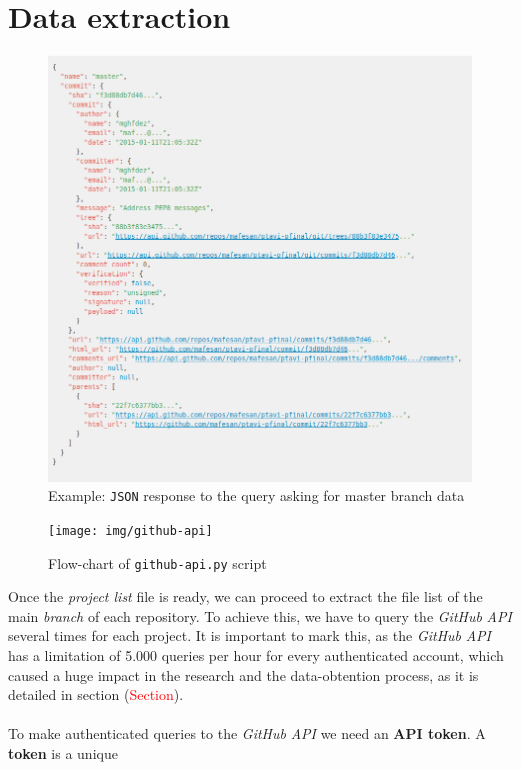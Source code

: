 \documentclass[a4paper, 12pt]{book}
\begin{document}
\section{Data extraction}
\label{sec:extraccion-datos}
\begin{figure}
  \centering
  \includegraphics[width=13cm, keepaspectratio]{img/gh-api-master-json-example}
  \caption{Example: \texttt{JSON} response to the query asking for master branch data}
  \label{fig:gh-api-master-json}
\end{figure}
\begin{figure}
  \centering
  \texttt{[image: img/github-api]}
  \caption{Flow-chart of \texttt{github-api.py} script}
  \label{fig:gh-api-diagram}
\end{figure}
Once the \emph{project list} file is ready, we can proceed to extract the file list of the main \textit{branch} of each
repository. To achieve this, we have to query the \emph{GitHub} \textit{API} several times for each project.
It is important to mark this, as the \emph{GitHub} \textit{API} has a limitation of 5.000 queries per hour for every authenticated
account, which caused a huge impact in the research and the data-obtention process, as it is detailed in section (\textcolor{red}{Section}).\\\\
To make authenticated queries to the \emph{GitHub} \textit{API} we need an \textbf{API token}. A \textbf{token} is a unique
\end{document}
